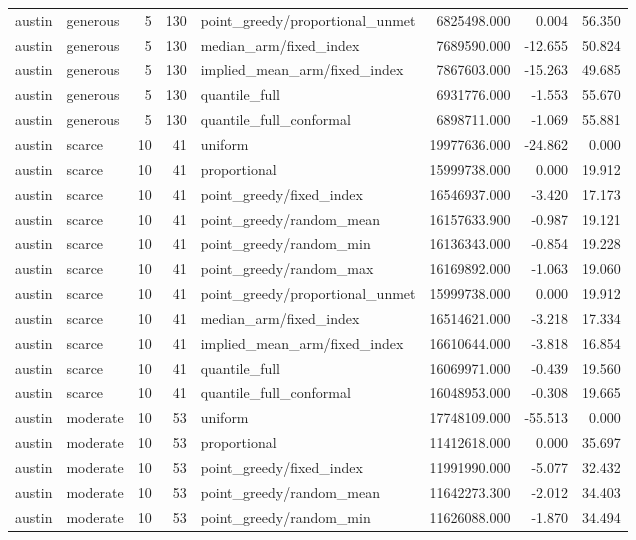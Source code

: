 \begin{tabular}{llrrlrrr}
austin & generous & 5 & 130 & point\_greedy/proportional\_unmet & 6825498.000 & 0.004 & 56.350 \\
austin & generous & 5 & 130 & median\_arm/fixed\_index & 7689590.000 & -12.655 & 50.824 \\
austin & generous & 5 & 130 & implied\_mean\_arm/fixed\_index & 7867603.000 & -15.263 & 49.685 \\
austin & generous & 5 & 130 & quantile\_full & 6931776.000 & -1.553 & 55.670 \\
austin & generous & 5 & 130 & quantile\_full\_conformal & 6898711.000 & -1.069 & 55.881 \\
austin & scarce & 10 & 41 & uniform & 19977636.000 & -24.862 & 0.000 \\
austin & scarce & 10 & 41 & proportional & 15999738.000 & 0.000 & 19.912 \\
austin & scarce & 10 & 41 & point\_greedy/fixed\_index & 16546937.000 & -3.420 & 17.173 \\
austin & scarce & 10 & 41 & point\_greedy/random\_mean & 16157633.900 & -0.987 & 19.121 \\
austin & scarce & 10 & 41 & point\_greedy/random\_min & 16136343.000 & -0.854 & 19.228 \\
austin & scarce & 10 & 41 & point\_greedy/random\_max & 16169892.000 & -1.063 & 19.060 \\
austin & scarce & 10 & 41 & point\_greedy/proportional\_unmet & 15999738.000 & 0.000 & 19.912 \\
austin & scarce & 10 & 41 & median\_arm/fixed\_index & 16514621.000 & -3.218 & 17.334 \\
austin & scarce & 10 & 41 & implied\_mean\_arm/fixed\_index & 16610644.000 & -3.818 & 16.854 \\
austin & scarce & 10 & 41 & quantile\_full & 16069971.000 & -0.439 & 19.560 \\
austin & scarce & 10 & 41 & quantile\_full\_conformal & 16048953.000 & -0.308 & 19.665 \\
austin & moderate & 10 & 53 & uniform & 17748109.000 & -55.513 & 0.000 \\
austin & moderate & 10 & 53 & proportional & 11412618.000 & 0.000 & 35.697 \\
austin & moderate & 10 & 53 & point\_greedy/fixed\_index & 11991990.000 & -5.077 & 32.432 \\
austin & moderate & 10 & 53 & point\_greedy/random\_mean & 11642273.300 & -2.012 & 34.403 \\
austin & moderate & 10 & 53 & point\_greedy/random\_min & 11626088.000 & -1.870 & 34.494 \\

\end{tabular}
